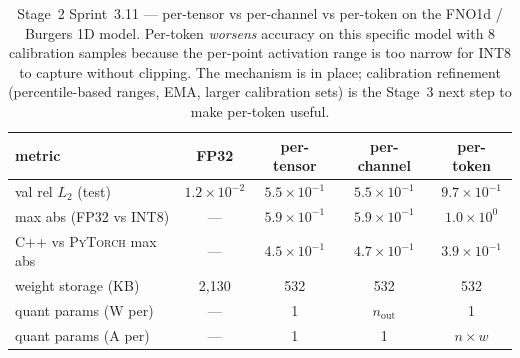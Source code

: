 \documentclass[10pt,twocolumn]{article}
\newcommand{\py}{\textsc{PyTorch}}
\begin{document}
\begin{table}[ht]
\centering
\caption{Stage~2 Sprint~3.11 --- per-tensor vs
per-channel vs per-token on the FNO1d / Burgers 1D
model.  Per-token \emph{worsens} accuracy on this
specific model with 8 calibration samples because
the per-point activation range is too narrow for
INT8 to capture without clipping.  The mechanism is
in place; calibration refinement (percentile-based
ranges, EMA, larger calibration sets) is the
Stage~3 next step to make per-token useful.}
\label{tab:int8-per-token}
\smallskip
\begin{tabular}{lcccc}
\toprule
metric & FP32 & per-tensor & per-channel & per-token \\
\midrule
val rel $L_2$ (test) & $1.2 \times 10^{-2}$ &
$5.5 \times 10^{-1}$ & $5.5 \times 10^{-1}$ &
$9.7 \times 10^{-1}$ \\
max abs (FP32 vs INT8) & --- &
$5.9 \times 10^{-1}$ & $5.9 \times 10^{-1}$ &
$1.0 \times 10^{0}$ \\
C{++} vs \py{} max abs & --- &
$4.5 \times 10^{-1}$ & $4.7 \times 10^{-1}$ &
$3.9 \times 10^{-1}$ \\
weight storage (KB)   & 2{,}130 & 532 & 532 & 532 \\
quant params (W per)  & --- & 1 & $n_{\mathrm{out}}$ & 1 \\
quant params (A per)  & --- & 1 & 1 & $n \times w$ \\
\bottomrule
\end{tabular}
\end{table}
\end{document}

